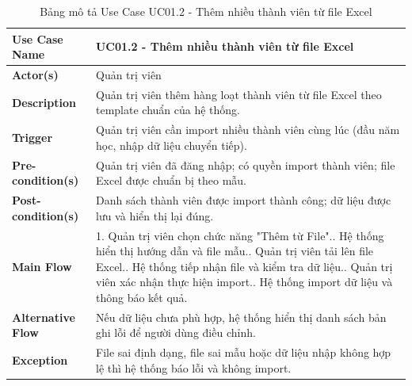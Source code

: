 \begin{table}[H]
	\centering
	\renewcommand{\arraystretch}{1.25}
	\begin{tabular}{|p{3.8cm}|p{11.2cm}|}
		\hline
		\textbf{Use Case Name} & \textbf{UC01.2 - Thêm nhiều thành viên từ file Excel} \\ \hline
		\textbf{Actor(s)} & Quản trị viên \\ \hline
		\textbf{Description} & Quản trị viên thêm hàng loạt thành viên từ file Excel theo template chuẩn của hệ thống. \\ \hline
		\textbf{Trigger} & Quản trị viên cần import nhiều thành viên cùng lúc (đầu năm học, nhập dữ liệu chuyển tiếp). \\ \hline
		\textbf{Pre-condition(s)} & Quản trị viên đã đăng nhập; có quyền import thành viên; file Excel được chuẩn bị theo mẫu. \\ \hline
		\textbf{Post-condition(s)} & Danh sách thành viên được import thành công; dữ liệu được lưu và hiển thị lại đúng. \\ \hline
		\textbf{Main Flow} & 1. Quản trị viên chọn chức năng "Thêm từ File".\newline
		2. Hệ thống hiển thị hướng dẫn và file mẫu.\newline
		3. Quản trị viên tải lên file Excel.\newline
		4. Hệ thống tiếp nhận file và kiểm tra dữ liệu.\newline
		5. Quản trị viên xác nhận thực hiện import.\newline
		6. Hệ thống import dữ liệu và thông báo kết quả. \\ \hline
		\textbf{Alternative Flow} & Nếu dữ liệu chưa phù hợp, hệ thống hiển thị danh sách bản ghi lỗi để người dùng điều chỉnh. \\ \hline
		\textbf{Exception} & File sai định dạng, file sai mẫu hoặc dữ liệu nhập không hợp lệ thì hệ thống báo lỗi và không import. \\ \hline
	\end{tabular}
	\caption{Bảng mô tả Use Case UC01.2 - Thêm nhiều thành viên từ file Excel}
\end{table}

